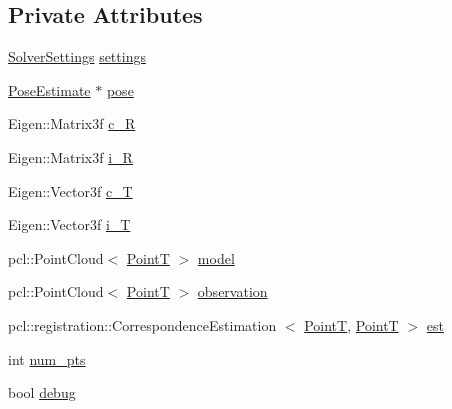 \subsection*{\-Private \-Attributes}
\begin{DoxyCompactItemize}
\item 
\hyperlink{structSolverSettings}{\-Solver\-Settings} \hyperlink{classICP_a7e3065919f63c9bdc0ff0677b5cf56d0}{settings}
\item 
\hyperlink{classPoseEstimate}{\-Pose\-Estimate} $\ast$ \hyperlink{classICP_a09c458b7e1daa98c6cc98177003794ce}{pose}
\item 
\-Eigen\-::\-Matrix3f \hyperlink{classICP_aee085ec283f657cb3980c529d48ba65b}{c\-\_\-\-R}
\item 
\-Eigen\-::\-Matrix3f \hyperlink{classICP_a07164ef6066cf0c9537881871cd56601}{i\-\_\-\-R}
\item 
\-Eigen\-::\-Vector3f \hyperlink{classICP_a55de298290d8e74617fdf19c153d55be}{c\-\_\-\-T}
\item 
\-Eigen\-::\-Vector3f \hyperlink{classICP_a63b486fc85453b0f09c6020e1c6227f4}{i\-\_\-\-T}
\item 
pcl\-::\-Point\-Cloud$<$ \hyperlink{common_8h_abd10555a534258e2739a38c928ef5db1}{\-Point\-T} $>$ \hyperlink{classICP_ae224713dd84e34bbef52a011046527af}{model}
\item 
pcl\-::\-Point\-Cloud$<$ \hyperlink{common_8h_abd10555a534258e2739a38c928ef5db1}{\-Point\-T} $>$ \hyperlink{classICP_a92b2b3089759aad730cb92a0976aea1b}{observation}
\item 
pcl\-::registration\-::\-Correspondence\-Estimation\*
$<$ \hyperlink{common_8h_abd10555a534258e2739a38c928ef5db1}{\-Point\-T}, \hyperlink{common_8h_abd10555a534258e2739a38c928ef5db1}{\-Point\-T} $>$ \hyperlink{classICP_acf6194ebbf168e4a6059945980752849}{est}
\item 
int \hyperlink{classICP_a9b8cf5129a0cb5ad3fd05b261d514bb6}{num\-\_\-pts}
\item 
bool \hyperlink{classICP_a6e81d1444353ba66d59cd16d2dc74d7c}{debug}
\end{DoxyCompactItemize}


